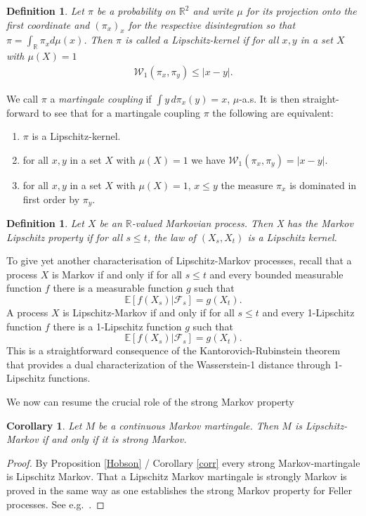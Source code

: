 \documentclass[11pt,a4paper]{article}%
\def\E{{\mathbb E}}
\def\R{{\mathbb R}}
\newtheorem{corollary}[theorem]{Corollary}
\newtheorem{definition}[theorem]{Definition}
\numberwithin{equation}{section}
\begin{document}
\begin{definition}
Let $\pi$ be a probability on  $\R^2 $ and write $\mu$ for its projection onto the first coordinate and  $(\pi_x)_x$ for the respective disintegration so that $\pi = \int_\R \pi_x d\mu(x)$. Then $\pi$ is called a Lipschitz-kernel if for all $x, y $ in a set $X$ with  $\mu(X)=1$ 
\begin{align}\label{kLip}
\mathcal W_1(\pi_x, \pi_{y})\leq |x-y|.
\end{align} 
\end{definition} 
We call $\pi$ a \emph{martingale coupling} if $\int y\, d\pi_x(y)=x$, $\mu$-a.s. It is then straight-forward to see that for a martingale coupling $\pi$ the following are equivalent: 
\begin{enumerate}
\item $\pi$ is a Lipschitz-kernel.
\item for all $x, y $ in a set $X$ with $\mu(X)=1$ we have
$
\mathcal W_1(\pi_x, \pi_{y})= |x-y|.
$
\item for all $x, y$ in a set $X$ with $\mu(X)=1$, $x\leq y$ the measure $\pi_x$ is dominated in first order by $\pi_{y}$.  
\end{enumerate}

\begin{definition}\label{Wass} 
Let $X$ be an $\R$-valued Markovian process. Then X has the Markov Lipschitz property if for all $s \leq t$, the law of $(X_s, X_t)$ is a Lipschitz kernel. 
\end{definition}
To give yet another characterisation of Lipschitz-Markov processes, recall that a process $X$ is Markov if and only if for all $s\leq t$ and every bounded measurable function $f$ there is a measurable function $g$ such that 
$$\E[f(X_s)|\mathcal F_s]= g(X_t).$$ 
A process $X$ is Lipschitz-Markov if and only if for all $s\leq t$ and every 1-Lipschitz function $f$ there is a 1-Lipschitz function $g$ such that 
$$\E[f(X_s)|\mathcal F_s]= g(X_t).$$
This is a straightforward consequence of the Kantorovich-Rubinstein theorem that provides a dual characterization of the Wasserstein-1 distance through 1-Lipschitz functions. 

We now can resume the crucial role of the strong Markov property

\begin{corollary}\label{SLM}
Let $M$ be a continuous Markov martingale. Then $M$ is Lipschitz-Markov if and only if it is strong Markov. 
\end{corollary}
\begin{proof} 
By Proposition \ref{Hobson} / Corollary \ref{corr} every strong Markov-martingale is Lipschitz Markov.  
That a Lipschitz Markov martingale is strongly Markov is proved in the same way as one establishes the strong Markov property for Feller processes. See e.g.\ \cite[Theorem 1.68]{Li10}. \end{proof}
\end{document}
